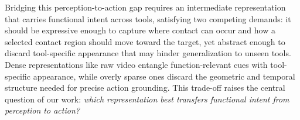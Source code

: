 Bridging this perception-to-action gap requires an intermediate representation that carries functional intent across tools, satisfying two competing demands: {it should be expressive enough to capture where contact can occur and how a selected contact region should move toward the target, yet abstract enough to discard tool-specific appearance that may hinder generalization to unseen tools.}
Dense representations like raw video entangle function-relevant cues with tool-specific appearance, while overly sparse ones discard the geometric and temporal structure needed for precise action grounding. This trade-off raises the central question of our work: \textit{which representation best transfers functional intent from perception to action?}

